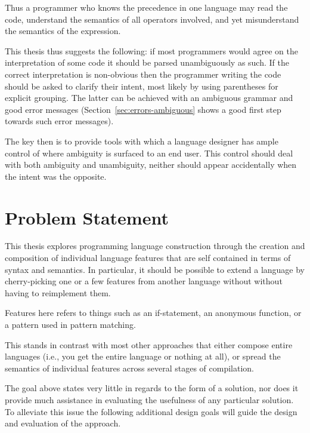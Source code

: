 \documentclass{kththesis}
\begin{document}
Thus a programmer who knows the precedence in one language may read the code, understand the semantics of all operators involved, and yet misunderstand the semantics of the expression.

This thesis thus suggests the following: if most programmers would agree on the interpretation of some code it should be parsed unambiguously as such. If the correct interpretation is non-obvious then the programmer writing the code should be asked to clarify their intent, most likely by using parentheses for explicit grouping. The latter can be achieved with an ambiguous grammar and good error messages (Section~\ref{sec:errors-ambiguous} shows a good first step towards such error messages).

The key then is to provide tools with which a language designer has ample control of where ambiguity is surfaced to an end user. This control should deal with both ambiguity and unambiguity, neither should appear accidentally when the intent was the opposite.

\section{Problem Statement} \label{sec:research-question}

This thesis explores programming language construction through the creation and composition of individual language features that are self contained in terms of syntax and semantics. In particular, it should be possible to extend a language by cherry-picking one or a few features from another language without without having to reimplement them.

Features here refers to things such as an if-statement, an anonymous function, or a pattern used in pattern matching.

This stands in contrast with most other approaches that either compose entire languages (i.e., you get the entire language or nothing at all), or spread the semantics of individual features across several stages of compilation.

The goal above states very little in regards to the form of a solution, nor does it provide much assistance in evaluating the usefulness of any particular solution. To alleviate this issue the following additional design goals will guide the design and evaluation of the approach.
\end{document}
